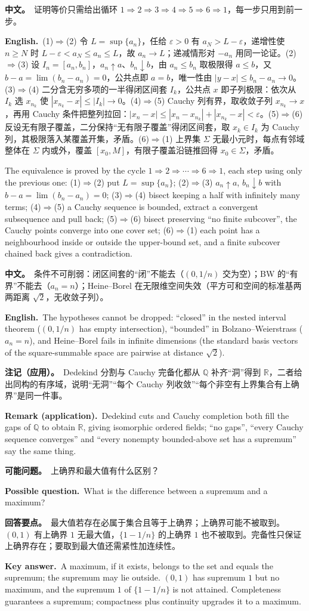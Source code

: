 \documentclass[UTF8,11pt,a4paper]{ctexart}
\newcommand{\R}{\mathbb{R}}
\newcommand{\Q}{\mathbb{Q}}
\newcommand{\BOTH}[2]{\par\noindent\textbf{中文。}\ #1\par\noindent\textbf{English.}\ #2\par}
\newcommand{\ASK}[4]{\begin{samepage}\par\noindent\textbf{可能问题。}\ #1\par\noindent\textbf{Possible question.}\ #2\par\noindent\textbf{回答要点。}\ #3\par\noindent\textbf{Key answer.}\ #4\medskip\end{samepage}}
\newcommand{\REMARK}[2]{\par\noindent\textbf{注记（应用）。}\ #1\par\noindent\textbf{Remark (application).}\ #2\par}
\begin{document}
\BOTH{证明等价只需给出循环 $1\Rightarrow2\Rightarrow3\Rightarrow4\Rightarrow5\Rightarrow6\Rightarrow1$，每一步只用到前一步。}{(1)$\Rightarrow$(2) 令 $L=\sup\{a_n\}$，任给 $\varepsilon>0$ 有 $a_N>L-\varepsilon$，递增性使 $n\ge N$ 时 $L-\varepsilon<a_N\le a_n\le L$，故 $a_n\to L$；递减情形对 $-a_n$ 用同一论证。(2)$\Rightarrow$(3) 设 $I_n=[a_n,b_n]$，$a_n\uparrow a$、$b_n\downarrow b$，由 $a_n\le b_n$ 取极限得 $a\le b$，又 $b-a=\lim(b_n-a_n)=0$，公共点即 $a=b$，唯一性由 $|y-x|\le b_n-a_n\to0$。(3)$\Rightarrow$(4) 二分含无穷多项的一半得闭区间套 $I_k$，公共点 $x$ 即子列极限：依次从 $I_k$ 选 $x_{n_k}$ 使 $|x_{n_k}-x|\le|I_k|\to0$。(4)$\Rightarrow$(5) Cauchy 列有界，取收敛子列 $x_{n_k}\to x$，再用 Cauchy 条件把整列拉回：$|x_n-x|\le|x_n-x_{n_k}|+|x_{n_k}-x|<\varepsilon$。(5)$\Rightarrow$(6) 反设无有限子覆盖，二分保持“无有限子覆盖”得闭区间套，取 $x_k\in I_k$ 为 Cauchy 列，其极限落入某覆盖开集，矛盾。(6)$\Rightarrow$(1) 上界集 $\Sigma$ 无最小元时，每点有邻域整体在 $\Sigma$ 内或外，覆盖 $[x_0,M]$，有限子覆盖沿链推回得 $x_0\in\Sigma$，矛盾。}{The equivalence is proved by the cycle $1\Rightarrow2\Rightarrow\cdots\Rightarrow6\Rightarrow1$, each step using only the previous one: (1)$\Rightarrow$(2) put $L=\sup\{a_n\}$; (2)$\Rightarrow$(3) $a_n\uparrow a$, $b_n\downarrow b$ with $b-a=\lim(b_n-a_n)=0$; (3)$\Rightarrow$(4) bisect keeping a half with infinitely many terms; (4)$\Rightarrow$(5) a Cauchy sequence is bounded, extract a convergent subsequence and pull back; (5)$\Rightarrow$(6) bisect preserving “no finite subcover”, the Cauchy points converge into one cover set; (6)$\Rightarrow$(1) each point has a neighbourhood inside or outside the upper-bound set, and a finite subcover chained back gives a contradiction.}
\BOTH{条件不可削弱：闭区间套的“闭”不能去（$(0,1/n)$ 交为空）；BW 的“有界”不能去（$a_n=n$）；Heine--Borel 在无限维空间失效（平方可和空间的标准基两两距离 $\sqrt2$，无收敛子列）。}{The hypotheses cannot be dropped: “closed” in the nested interval theorem ($(0,1/n)$ has empty intersection), “bounded” in Bolzano--Weierstrass ($a_n=n$), and Heine--Borel fails in infinite dimensions (the standard basis vectors of the square-summable space are pairwise at distance $\sqrt2$).}
\REMARK{Dedekind 分割与 Cauchy 完备化都从 $\Q$ 补齐“洞”得到 $\R$，二者给出同构的有序域，说明“无洞”“每个 Cauchy 列收敛”“每个非空有上界集合有上确界”是同一件事。}{Dedekind cuts and Cauchy completion both fill the gaps of $\Q$ to obtain $\R$, giving isomorphic ordered fields; “no gaps”, “every Cauchy sequence converges” and “every nonempty bounded-above set has a supremum” say the same thing.}
\ASK{上确界和最大值有什么区别？}{What is the difference between a supremum and a maximum?}{最大值若存在必属于集合且等于上确界；上确界可能不被取到。$(0,1)$ 有上确界 $1$ 无最大值，$\{1-1/n\}$ 的上确界 $1$ 也不被取到。完备性只保证上确界存在；要取到最大值还需紧性加连续性。}{A maximum, if it exists, belongs to the set and equals the supremum; the supremum may lie outside. $(0,1)$ has supremum $1$ but no maximum, and the supremum $1$ of $\{1-1/n\}$ is not attained. Completeness guarantees a supremum; compactness plus continuity upgrades it to a maximum.}
\end{document}
